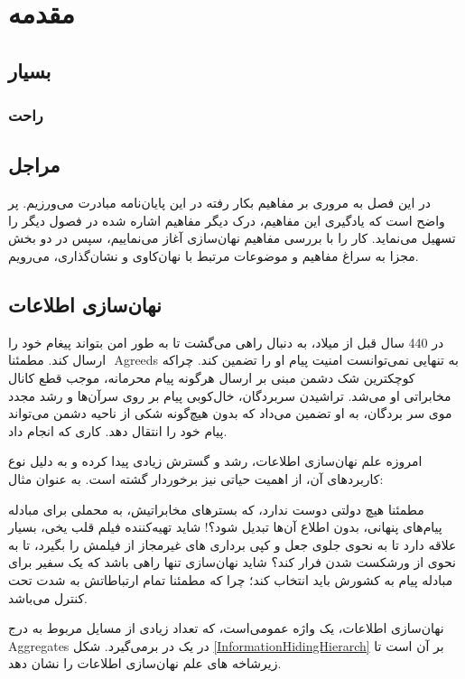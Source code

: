 \chapter{مقدمه}
\section{بسیار}
\subsection{راحت}

\section{مراجل}
در این فصل به مروری بر مفاهیم بکار رفته در این پایان‌نامه مبادرت می‌ورزیم. پر واضح است که یادگیری این مفاهیم، درک دیگر مفاهیم اشاره شده در فصول دیگر را تسهیل می‌نماید. کار را با بررسی مفاهیم نهان‌سازی آغاز می‌نماییم، سپس در دو بخش مجزا به سراغ مفاهیم و موضوعات مرتبط با نهان‌کاوی و نشان‌گذاری، می‌رویم. 

\section{نهان‌سازی اطلاعات}
\label{InformationHiding}
در 440 سال قبل از میلاد، به دنبال راهی می‌گشت تا به طور امن بتواند پیغام خود را ارسال کند. مطمئنا ‎ ‎\glspl{Agreed}‎ به تنهایی نمی‌توانست امنیت پیام او را تضمین کند. چراکه کوچکترین شک دشمن مبنی بر ارسال هرگونه پیام محرمانه، موجب  قطع کانال مخابراتی او می‌شد. تراشیدن سربردگان، خال‌کوبی پیام بر روی سرآن‌ها و رشد مجدد موی سر بردگان، به او تضمین می‌داد که بدون هیچ‌گونه شکی از ناحیه دشمن می‌تواند پیام خود را انتقال دهد. کاری که {} انجام داد.
 
امروزه علم نهان‌سازی اطلاعات، رشد و گسترش زیادی پیدا کرده و به دلیل نوع کاربردهای آن، از اهمیت حیاتی نیز برخوردار گشته است. به عنوان مثال:
\begin{itemize}
\X
مطمئنا هیچ دولتی دوست ندارد، که بسترهای مخابراتیش، به محملی برای مبادله پیام‌های پنهانی، بدون اطلاع آن‌ها تبدیل شود؟!  
\X
شاید تهیه‌کننده فیلم قلب یخی، بسیار علاقه دارد تا به نحوی جلوی جعل و کپی برداری های غیرمجاز از فیلمش را بگیرد، تا به نحوی از ورشکست شدن فرار کند؟
\X
شاید نهان‌سازی تنها راهی باشد که یک سفیر برای مبادله پیام به کشورش باید انتخاب کند؛ چرا که مطمئنا تمام ارتباطاتش به شدت تحت کنترل می‌باشد. 
\end{itemize}
نهان‌سازی اطلاعات، یک واژه عمومی‌است، که تعداد زیادی از مسایل مربوط به درج   ‎\glspl{Aggregate}‎ در یک در برمی‌گیرد. شکل {\ref{InformationHidingHierarch}} بر آن است تا زیرشاخه های علم نهان‌سازی اطلاعات را نشان دهد. 

